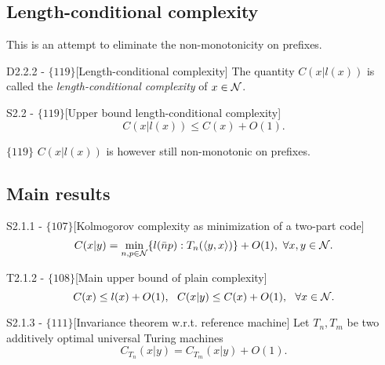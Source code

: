 \documentclass{article}
\begin{document}
\subsection{Length-conditional complexity}

This is an attempt to eliminate the non-monotonicity on prefixes.
\begin{flexidefinition}{D2.2.2 - $\{119\}$}[Length-conditional complexity]
    The quantity $C(x|l(x))$ is called the \textit{length-conditional complexity} of $x \in \mathcal{N}$.
\end{flexidefinition}


\begin{flexilemma}{S2.2 - $\{119\}$}[Upper bound length-conditional complexity]
    \begin{equation}
        C(x|l(x)) \leq C(x) + O(1).
    \end{equation}
\end{flexilemma}

$\{119\}$ $C(x|l(x))$ is however still non-monotonic on prefixes.

\subsection{Main results}

\begin{flexilemma}{S2.1.1 - $\{107\}$}[Kolmogorov complexity as minimization of a two-part code]
    \begin{equation}
        C(x|y) = \min_{n,p \in \mathcal{N}} \{l(\bar n p) : T_n(\langle y , x \rangle)\} + O(1), \  \forall x,y \in \mathcal{N}.
    \end{equation}
\end{flexilemma}

\begin{flexitheorem}{T2.1.2 - $\{108\}$}[Main upper bound of plain complexity]
    \begin{equation}
        C(x) \leq l(x) + O(1), \ \ C(x|y) \leq C(x) + O(1), \ \ \forall x \in \mathcal{N}.
    \end{equation}
\end{flexitheorem}

\begin{flexitheorem}{S2.1.3 - $\{111\}$}[Invariance theorem w.r.t. reference machine]
    Let $T_n,T_m$ be two additively optimal universal Turing machines 
    \begin{equation}
        C_{T_n}(x|y) = C_{T_m}(x|y) + O(1).
    \end{equation}
\end{flexitheorem}
\end{document}
